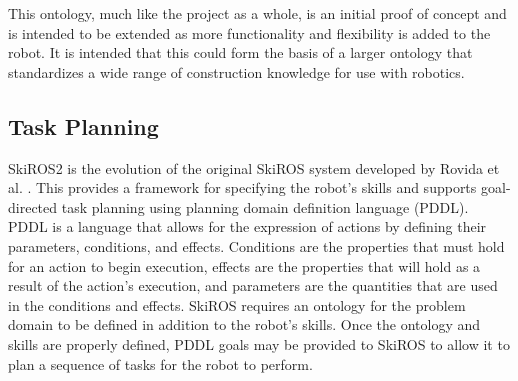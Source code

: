 This ontology, much like the project as a whole, is an initial proof of concept and is intended to be extended as more functionality and flexibility is added to the robot. It is intended that this could form the basis of a larger ontology that standardizes a wide range of construction knowledge for use with robotics.

\subsection{Task Planning} \label{sec:task_planning}
SkiROS2 is the evolution of the original SkiROS system developed by Rovida et al. \cite{rovida2017skiros}. This provides a framework for specifying the robot's skills and supports goal-directed task planning using planning domain definition language (PDDL). PDDL is a language that allows for the expression of actions by defining their parameters, conditions, and effects. Conditions are the properties that must hold for an action to begin execution, effects are the properties that will hold as a result of the action's execution, and parameters are the quantities that are used in the conditions and effects. SkiROS requires an ontology for the problem domain to be defined in addition to the robot's skills. Once the ontology and skills are properly defined, PDDL goals may be provided to SkiROS to allow it to plan a sequence of tasks for the robot to perform.

